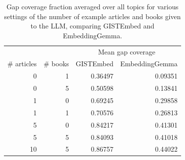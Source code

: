 \begin{table}
\caption{Gap coverage fraction averaged over all topics for various settings of the number of example articles and books given to the LLM, comparing GISTEmbed and EmbeddingGemma.}
\label{tab:triplet_gap_coverage_gap1}
\begin{tabular}{rrrr}
\toprule
\multicolumn{2}{c}{} & \multicolumn{2}{c}{Mean gap coverage} \\
\# articles & \# books & GISTEmbed & EmbeddingGemma \\
\midrule
0 & 1 & 0.36497 & 0.09351 \\
0 & 5 & 0.50598 & 0.13841 \\
1 & 0 & 0.69245 & 0.29858 \\
1 & 1 & 0.70576 & 0.26813 \\
5 & 0 & 0.84217 & 0.41301 \\
5 & 5 & 0.84093 & 0.41018 \\
10 & 5 & 0.86757 & 0.44022 \\
\bottomrule
\end{tabular}
\end{table}

